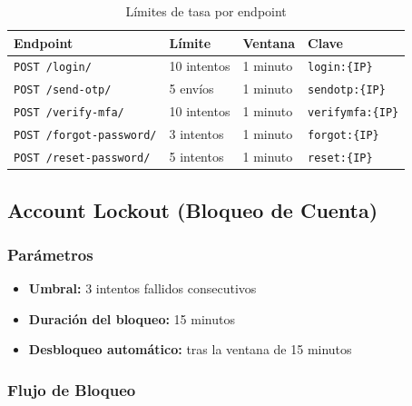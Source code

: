 \documentclass[12pt,a4paper,openany]{article}
\begin{document}
\begin{table}[H]
\centering
\caption{Límites de tasa por endpoint}
\begin{tabular}{@{}llll@{}}
\toprule
\textbf{Endpoint} & \textbf{Límite} & \textbf{Ventana} & \textbf{Clave} \\
\midrule
\texttt{POST /login/} & 10 intentos & 1 minuto & \texttt{login:\{IP\}} \\
\texttt{POST /send-otp/} & 5 envíos & 1 minuto & \texttt{sendotp:\{IP\}} \\
\texttt{POST /verify-mfa/} & 10 intentos & 1 minuto & \texttt{verifymfa:\{IP\}} \\
\texttt{POST /forgot-password/} & 3 intentos & 1 minuto & \texttt{forgot:\{IP\}} \\
\texttt{POST /reset-password/} & 5 intentos & 1 minuto & \texttt{reset:\{IP\}} \\
\bottomrule
\end{tabular}
\end{table}

\subsection{Account Lockout (Bloqueo de Cuenta)}

\subsubsection{Parámetros}

\begin{itemize}
    \item \textbf{Umbral:} 3 intentos fallidos consecutivos
    \item \textbf{Duración del bloqueo:} 15 minutos
    \item \textbf{Desbloqueo automático:} tras la ventana de 15 minutos
\end{itemize}

\subsubsection{Flujo de Bloqueo}
\end{document}
